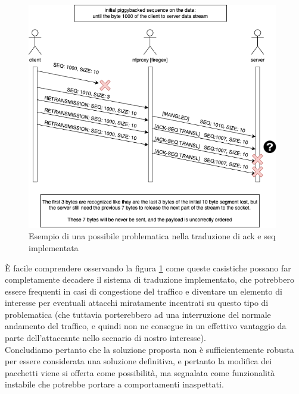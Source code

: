 \begin{figure}[H]
    \centering
    \includegraphics[width=0.98\textwidth]{images/chapter3/TCP_ack_seq_transl_failure.drawio.png}
    \caption{Esempio di una possibile problematica nella traduzione di ack e seq implementata}
    \label{fig:tcp_ack_seq_transl_failure}
\end{figure}

È facile comprendere osservando la figura \ref{fig:tcp_ack_seq_transl_failure} come queste casistiche possano far completamente
decadere il sistema di traduzione implementato, che potrebbero essere frequenti in casi di congestione del traffico e diventare
un elemento di interesse per eventuali attacchi miratamente incentrati su questo tipo di problematica (che tuttavia porterebbero ad una
interruzione del normale andamento del traffico, e quindi non ne consegue in un effettivo vantaggio da parte dell'attaccante nello scenario di nostro interesse).\\

Concludiamo pertanto che la soluzione proposta non è sufficientemente robusta per essere considerata una soluzione definitiva, e pertanto la modifica dei pacchetti viene si
offerta come possibilità, ma segnalata come funzionalità instabile che potrebbe portare a comportamenti inaspettati.\\

